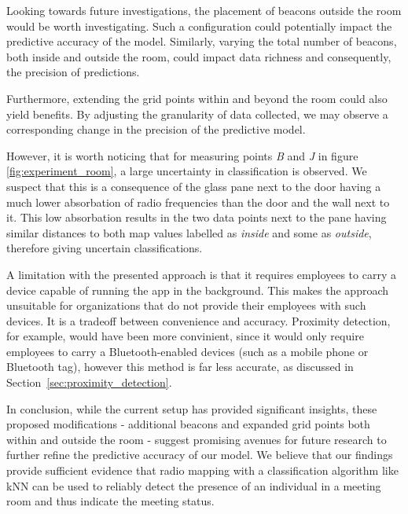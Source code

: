 Looking towards future investigations, the placement of beacons outside the room would be worth investigating.
Such a configuration could potentially impact the predictive accuracy of the model.
Similarly, varying the total number of beacons, both inside and outside the room, could impact data richness and consequently, the precision of predictions.

Furthermore, extending the grid points within and beyond the room could also yield benefits. By adjusting the granularity of data collected, we may observe a corresponding change in the precision of the predictive model. 

However, it is worth noticing that for measuring points \textit{B} and \textit{J} in figure \ref{fig:experiment_room}, a large uncertainty in classification is observed.
We suspect that this is a consequence of the glass pane next to the door having a much lower absorbation of radio frequencies than the door and the wall next to it.
This low absorbation results in the two data points next to the pane having similar distances to both map values labelled as \textit{inside} and some as \textit{outside}, therefore giving uncertain classifications.

A limitation with the presented approach is that it requires employees to carry a device capable of running the app in the background.
This makes the approach unsuitable for organizations that do not provide their employees with such devices.
It is a tradeoff between convenience and accuracy.
Proximity detection, for example, would have been more convinient, since it would only require employees to carry a Bluetooth-enabled devices (such as a mobile phone or Bluetooth tag), however this method is far less accurate, as discussed in Section~\ref{sec:proximity_detection}.


In conclusion, while the current setup has provided significant insights, these proposed modifications - additional beacons and expanded grid points both within and outside the room - suggest promising avenues for future research to further refine the predictive accuracy of our model.
We believe that our findings provide sufficient evidence that radio mapping with a classification algorithm like kNN can be used to reliably detect the presence of an individual in a meeting room and thus indicate the meeting status.